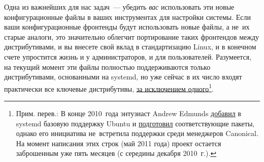 \documentclass[10pt,oneside,a4paper]{article}
\begin{document}
Одна из важнейших для нас задач~--- убедить \emph{вас} использовать эти новые
конфигурационные файлы в ваших инструментах для настройки системы. Если ваши
конфигурационные фронтенды будут использовать новые файлы, а не~их старые
аналоги, это значительно облегчит портирование таких фронтендов между
дистрибутивами, и вы внесете свой вклад в стандартизацию Linux, и в конечном
счете упростится жизнь и у администраторов, и для пользователей. Разумеется, на
текущий момент эти файлы полностью поддерживаются только дистрибутивами,
основанными на systemd, но уже сейчас в их число входят практически все ключевые
дистрибутивы, \href{http://www.ubuntu.com/}{за исключением
одного}\footnote{Прим. перев.: В конце 2010~года энтузиаст Andrew Edmunds
\href{http://cgit.freedesktop.org/systemd/commit/?id=858dae181bb5461201ac1c04732d3ef4c67a0256}{добавил}
в systemd базовую поддержку Ubuntu и
\href{https://wiki.ubuntu.com/systemd}{подготовил} соответствующие пакеты,
однако его инициатива не~встретила поддержки среди менеджеров Canonical. На
момент написания этих строк (май 2011 года) проект остается заброшенным уже пять
месяцев (с середины декабря 2010~г.).}.
\end{document}
